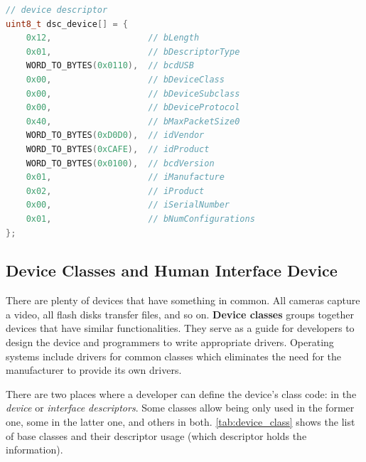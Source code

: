\pagebreak
\begin{lstlisting}[caption={Example of device descriptor in C language},
                   label={lst:dsc_example},
                   language=c]
// device descriptor
uint8_t dsc_device[] = {
    0x12,                   // bLength
    0x01,                   // bDescriptorType
    WORD_TO_BYTES(0x0110),  // bcdUSB
    0x00,                   // bDeviceClass
    0x00,                   // bDeviceSubclass
    0x00,                   // bDeviceProtocol
    0x40,                   // bMaxPacketSize0
    WORD_TO_BYTES(0xD0D0),  // idVendor
    WORD_TO_BYTES(0xCAFE),  // idProduct
    WORD_TO_BYTES(0x0100),  // bcdVersion
    0x01,                   // iManufacture
    0x02,                   // iProduct
    0x00,                   // iSerialNumber
    0x01,                   // bNumConfigurations
};
\end{lstlisting}

\subsection*{Device Classes and Human Interface Device}
\label{hid}
There are plenty of devices that have something in common. All cameras capture a video, all flash disks transfer files, and so on. \textbf{Device classes} groups together devices that have similar functionalities. They serve as a guide for developers to design the device and programmers to write appropriate drivers. Operating systems include drivers for common classes which eliminates the need for the manufacturer to provide its own drivers.

There are two places where a developer can define the device's class code: in the \emph{device} or \emph{interface descriptors}. Some classes allow being only used in the former one, some in the latter one, and others in both. \autoref{tab:device_class} shows the list of base classes and their descriptor usage (which descriptor holds the information).

